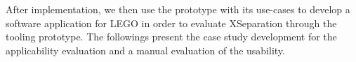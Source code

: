 After implementation, we then use the prototype with its use-cases to develop a software application for LEGO in order to evaluate XSeparation through the tooling prototype.
The followings present the case study development for the applicability evaluation and a manual evaluation of the usability.

